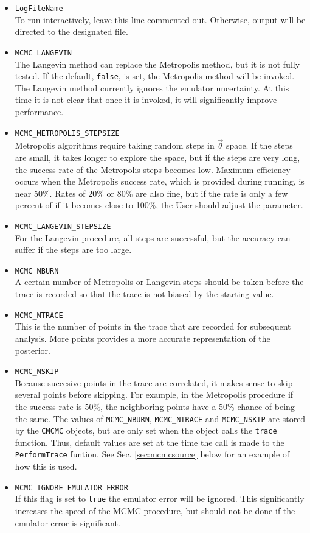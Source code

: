 \documentclass[UserManual.tex]{subfiles}
\begin{document}
\begin{itemize}\itemsep=0pt
\item {\tt LogFileName}\\
To run interactively, leave this line commented out. Otherwise, output will be directed to the designated file.
\item {\tt MCMC\_LANGEVIN}\\
The Langevin method can replace the Metropolis method, but it is not fully tested. If the default, {\tt false}, is set, the Metropolis method will be invoked. The Langevin method currently ignores the emulator uncertainty. At this time it is not clear that once it is invoked, it will significantly improve performance.
\item {\tt MCMC\_METROPOLIS\_STEPSIZE}\\
Metropolis algorithms require taking random steps in $\vec{\theta}$ space. If the steps are small, it takes longer to explore the space, but if the steps are very long, the success rate of the Metropolis steps becomes low. Maximum efficiency occurs when the Metropolis success rate, which is provided during running, is near 50\%. Rates of 20\% or 80\% are also fine, but if the rate is only a few percent of if it becomes close to 100\%, the User should adjust the parameter.
\item{\tt MCMC\_LANGEVIN\_STEPSIZE}\\
For the Langevin procedure, all steps are successful, but the accuracy can suffer if the steps are too large.
\item{\tt MCMC\_NBURN}\\
A certain number of Metropolis or Langevin steps should be taken before the trace is recorded so that the trace is not biased by the starting value.
\item {\tt MCMC\_NTRACE}\\
This is the number of points in the trace that are recorded for subsequent analysis. More points provides a more accurate representation of the posterior.
\item {\tt MCMC\_NSKIP}\\
Because succesive points in the trace are correlated, it makes sense to skip several points before skipping. For example, in the Metropolis procedure if the success rate is 50\%, the neighboring points have a 50\% chance of being the same. The values of {\tt MCMC\_NBURN}, {\tt MCMC\_NTRACE} and {\tt MCMC\_NSKIP} are stored by the {\tt CMCMC} objects, but are only set when the object calls the {\tt trace} function. Thus, default values are set at the time the call is made to the {\tt PerformTrace} funtion.  See Sec. \ref{sec:mcmcsource} below for an example of how this is used. 
\item {\tt MCMC\_IGNORE\_EMULATOR\_ERROR}\\
If this flag is set to {\tt true} the emulator error will be ignored. This significantly increases the speed of the MCMC procedure, but should not be done if the emulator error is significant.
\end{itemize}
\end{document}
